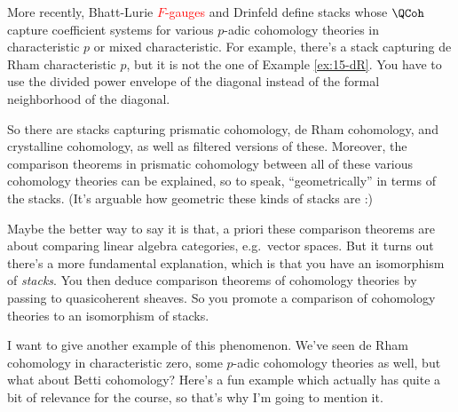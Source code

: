 \begin{example}[\yt{35m2s}{Prismatization}]
  More recently, Bhatt-Lurie \cite{APC,BLPrismatization} \citeme\textcolor{red}{$F$-gauges} and Drinfeld \citeme define stacks whose $\QCoh$ capture coefficient systems for various $p$-adic cohomology theories in characteristic $p$ or mixed characteristic. For example, there's a stack capturing de Rham characteristic $p$, but it is not the one of Example \ref{ex:15-dR}. You have to use the divided power envelope of the diagonal instead of the formal neighborhood of the diagonal.
  
  So there are stacks capturing prismatic cohomology, de Rham cohomology, and crystalline cohomology, as well as filtered versions of these. Moreover, the comparison theorems in prismatic cohomology between all of these various cohomology theories can be explained, so to speak, ``geometrically'' in terms of the stacks. (It's arguable how geometric these kinds of stacks are :)
  
  Maybe the better way to say it is that, a priori these comparison theorems are about comparing linear algebra categories, e.g.\ vector spaces. But it turns out there's a more fundamental explanation, which is that you have an isomorphism of \emph{stacks}. You then deduce comparison theorems of cohomology theories by passing to quasicoherent sheaves. So you promote a comparison of cohomology theories to an isomorphism of stacks.
\end{example}

I want to give another example of this phenomenon. We've seen de Rham cohomology in characteristic zero, some $p$-adic cohomology theories as well, but what about Betti cohomology? Here's a fun example which actually has quite a bit of relevance for the course, so that's why I'm going to mention it.

